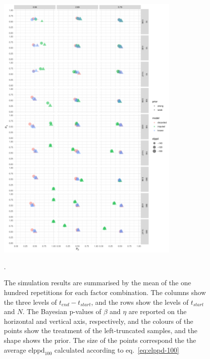 \begin{figure}
    \centering
    \includegraphics[width=0.8\textwidth]{./figures/ch-2/sim-results-pvalues.pdf}
    \caption{The simulation results are summarised by the mean of the one hundred repetitions for each factor combination. The columns show the three levels of $t_{end} - t_{start}$, and the rows show the levels of $t_{start}$ and $N$. The Bayesian p-values of $\beta$ and $\eta$ are reported on the horizontal and vertical axis, respectively, and the colours of the points show the treatment of the left-truncated samples, and the shape shows the prior. The size of the points correspond the the average $\text{elppd}_{100}$ calculated according to eq.~\eqref{eq:elppd-100}}.
    \label{fig:sim-study-pvalue}
\end{figure}

